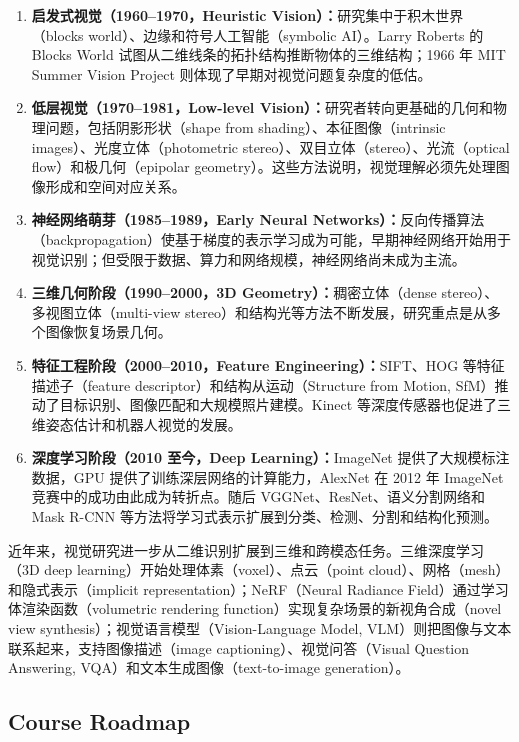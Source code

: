 \begin{enumerate}[label=\arabic*.]
    \item \textbf{启发式视觉（1960--1970，Heuristic Vision）：}研究集中于积木世界（blocks world）、边缘和符号人工智能（symbolic AI）。Larry Roberts 的 Blocks World 试图从二维线条的拓扑结构推断物体的三维结构；1966 年 MIT Summer Vision Project 则体现了早期对视觉问题复杂度的低估。
    \item \textbf{低层视觉（1970--1981，Low-level Vision）：}研究者转向更基础的几何和物理问题，包括阴影形状（shape from shading）、本征图像（intrinsic images）、光度立体（photometric stereo）、双目立体（stereo）、光流（optical flow）和极几何（epipolar geometry）。这些方法说明，视觉理解必须先处理图像形成和空间对应关系。
    \item \textbf{神经网络萌芽（1985--1989，Early Neural Networks）：}反向传播算法（backpropagation）使基于梯度的表示学习成为可能，早期神经网络开始用于视觉识别；但受限于数据、算力和网络规模，神经网络尚未成为主流。
    \item \textbf{三维几何阶段（1990--2000，3D Geometry）：}稠密立体（dense stereo）、多视图立体（multi-view stereo）和结构光等方法不断发展，研究重点是从多个图像恢复场景几何。
    \item \textbf{特征工程阶段（2000--2010，Feature Engineering）：}SIFT、HOG 等特征描述子（feature descriptor）和结构从运动（Structure from Motion, SfM）推动了目标识别、图像匹配和大规模照片建模。Kinect 等深度传感器也促进了三维姿态估计和机器人视觉的发展。
    \item \textbf{深度学习阶段（2010 至今，Deep Learning）：}ImageNet 提供了大规模标注数据，GPU 提供了训练深层网络的计算能力，AlexNet 在 2012 年 ImageNet 竞赛中的成功由此成为转折点。随后 VGGNet、ResNet、语义分割网络和 Mask R-CNN 等方法将学习式表示扩展到分类、检测、分割和结构化预测。
\end{enumerate}

近年来，视觉研究进一步从二维识别扩展到三维和跨模态任务。三维深度学习（3D deep learning）开始处理体素（voxel）、点云（point cloud）、网格（mesh）和隐式表示（implicit representation）；NeRF（Neural Radiance Field）通过学习体渲染函数（volumetric rendering function）实现复杂场景的新视角合成（novel view synthesis）；视觉语言模型（Vision-Language Model, VLM）则把图像与文本联系起来，支持图像描述（image captioning）、视觉问答（Visual Question Answering, VQA）和文本生成图像（text-to-image generation）。

\subsection{Course Roadmap}

